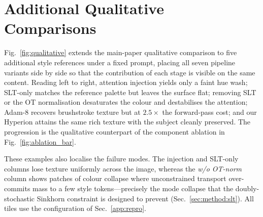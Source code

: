 \section{Additional Qualitative Comparisons}
\label{app:qualitative}

Fig.~\ref{fig:qualitative} extends the main-paper qualitative comparison to five
additional style references under a fixed prompt, placing all seven pipeline
variants side by side so that the contribution of each stage is visible on the
same content. Reading left to right, attention injection yields only a faint hue
wash; SLT-only matches the reference palette but leaves the surface flat;
removing SLT or the OT normalisation desaturates the colour and destabilises the
attention; Adam-8 recovers brushstroke texture but at $2.5\times$ the
forward-pass cost; and our Hyperion attains the same rich texture with the subject
cleanly preserved. The progression is the qualitative counterpart of the
component ablation in Fig.~\ref{fig:ablation_bar}.

These examples also localise the failure modes. The injection and SLT-only
columns lose texture uniformly across the image, whereas the \emph{w/o OT-norm}
column shows patches of colour collapse where unconstrained transport
over-commits mass to a few style tokens---precisely the mode collapse that the
doubly-stochastic Sinkhorn constraint is designed to prevent
(Sec.~\ref{sec:method:slt}). All tiles use the configuration of
Sec.~\ref{app:repro}.

